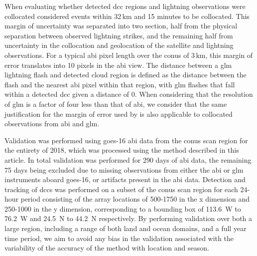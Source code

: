 When evaluating whether detected \acrshort{dcc} regions and lightning observations were collocated \citet{muller_novel_2019} considered events within 32\,\unit{km} and 15 minutes to be collocated.
This margin of uncertainty was separated into two section, half from the physical separation between observed lightning strikes, and the remaining half from uncertainty in the collocation and geolocation of the satellite and lightning observations.
For a typical \acrshort{abi} pixel length over the \acrshort{conus} of 3\,\unit{km}, this margin of error translates into 10 pixels in the \acrshort{abi} view.
The distance between a \acrshort{glm} lightning flash and detected cloud region is defined as the distance between the flash and the nearest \acrshort{abi} pixel within that region, with \acrshort{glm} flashes that fall within a detected \acrshort{dcc} given a distance of 0.
When considering that the resolution of \acrshort{glm} is a factor of four less than that of \acrshort{abi}, we consider that the same justification for the margin of error used by \citet{muller_novel_2019} is also applicable to collocated observations from \acrshort{abi} and \acrshort{glm}.

Validation was performed using \acrshort{goes}-16 \acrshort{abi} data from the \acrshort{conus} scan region for the entirety of 2018, which was processed using the method described in this article.
In total validation was performed for 290 days of \acrshort{abi} data, the remaining 75 days being excluded due to missing observations from either the \acrshort{abi} or \acrshort{glm} instruments aboard \acrshort{goes}-16, or artifacts present in the \acrshort{abi} data.
Detection and tracking of \acrshort{dcc}s was performed on a subset of the \acrshort{conus} scan region for each 24-hour period consisting of the array locations of 500-1750 in the x dimension and 250-1000 in the y dimension, corresponding to a bounding box of 113.6~\degree W to 76.2~\degree W and 24.5~\degree N to 44.2~\degree N respectively.
By performing validation over both a large region, including a range of both land and ocean domains, and a full year time period, we aim to avoid any bias in the validation associated with the variability of the accuracy of the method with location and season.

